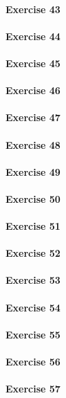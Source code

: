 \paragraph{Exercise 43}
\paragraph{Exercise 44}
\paragraph{Exercise 45}
\paragraph{Exercise 46}
\paragraph{Exercise 47}
\paragraph{Exercise 48}
\paragraph{Exercise 49}
\paragraph{Exercise 50}
\paragraph{Exercise 51}
\paragraph{Exercise 52}
\paragraph{Exercise 53}
\paragraph{Exercise 54}
\paragraph{Exercise 55}
\paragraph{Exercise 56}
\paragraph{Exercise 57}
